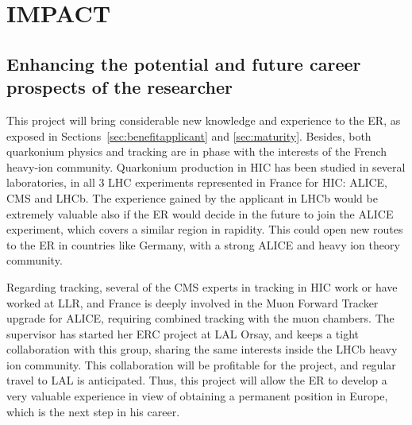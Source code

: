 \documentclass[a4paper,11pt]{article}
\newcommand{\ER}{ER\xspace}
\newcommand{\Supervisor}{The supervisor\xspace}
\begin{document}
%           

\section{IMPACT}
\label{sec:impact}

%               

\subsection{Enhancing the potential and future career prospects of the researcher }
\label{sec:enhancement}

This project will bring considerable new knowledge and experience to the \ER, as exposed in Sections~\ref{sec:benefitapplicant} and \ref{sec:maturity}. Besides, both quarkonium physics and tracking are in phase with the interests of the French heavy-ion community. Quarkonium production in HIC has been studied in several laboratories, in all 3 LHC experiments represented in France for HIC: ALICE, CMS and LHCb. 
The experience gained by the applicant in LHCb would be extremely valuable
also if the \ER would decide in the future to join the ALICE experiment, which 
covers a similar region in rapidity. This could open new routes to the \ER 
in countries like Germany, with a strong ALICE and heavy ion theory community.

Regarding tracking, several of the CMS experts in tracking in HIC work or have worked at LLR, and France is deeply involved in the Muon Forward Tracker upgrade for ALICE, requiring combined tracking with the muon chambers. \Supervisor has started her ERC project at LAL Orsay, and keeps a tight collaboration with this group, sharing the same interests inside the LHCb heavy ion community. This collaboration will be profitable for the project, and regular travel to LAL is anticipated. Thus, this project will allow the \ER to develop a very valuable experience in view of obtaining a permanent position in Europe, which is the next step in his career.



%                
\end{document}
